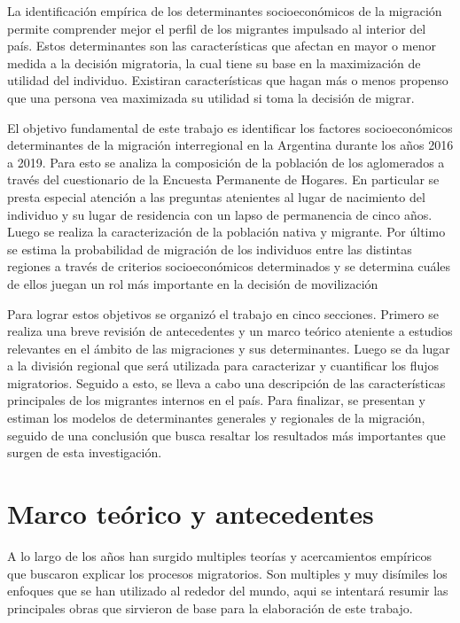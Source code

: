\documentclass[12pt,a4paper]{article}
\begin{document}
La identificación empírica de los determinantes socioeconómicos de la migración permite comprender mejor el perfil de los migrantes impulsado al interior del país. Estos determinantes son las características que afectan en mayor o menor medida a la decisión migratoria, la cual tiene su base en la maximización de utilidad del individuo. Existiran características que hagan más o menos propenso que una persona vea maximizada su utilidad si toma la decisión de migrar.

El objetivo fundamental de este trabajo es identificar los factores socioeconómicos determinantes de la migración interregional en la Argentina durante los años 2016 a 2019. Para esto se analiza la composición de la población de los aglomerados a través del cuestionario de la Encuesta Permanente de Hogares. En particular se presta especial atención a las preguntas atenientes al lugar de nacimiento del individuo y su lugar de residencia con un lapso de permanencia de cinco años. Luego se realiza la caracterización de la población nativa y migrante. Por último se estima la probabilidad de migración de los individuos entre las distintas regiones a través de criterios socioeconómicos determinados y se determina cuáles de ellos juegan un rol más importante en la decisión de movilización

Para lograr estos objetivos se organizó el trabajo en cinco secciones. Primero se realiza una breve revisión de antecedentes y un marco teórico ateniente a estudios relevantes en el ámbito de las migraciones y sus determinantes. Luego se da lugar a la división regional que será utilizada para caracterizar y cuantificar los flujos migratorios. Seguido a esto, se lleva a cabo una descripción de las características principales de los migrantes internos en el país. Para finalizar, se presentan y estiman los modelos de determinantes generales y regionales de la migración, seguido de una conclusión que busca resaltar los resultados más importantes que surgen de esta investigación.

\newpage
\section{Marco teórico y antecedentes}
A lo largo de los años han surgido multiples teorías y acercamientos empíricos que buscaron explicar los procesos migratorios. Son multiples y muy disímiles los enfoques que se han utilizado al rededor del mundo, aqui se intentará resumir las principales obras que sirvieron de base para la elaboración de este trabajo.
\end{document}
